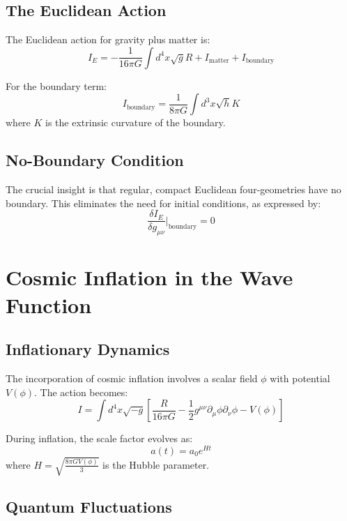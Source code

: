 \documentclass[12pt,a4paper]{article}
\begin{document}
\subsection{The Euclidean Action}

The Euclidean action for gravity plus matter is:
\begin{equation}
I_E = -\frac{1}{16\pi G}\int d^4x \sqrt{g} R + I_{\text{matter}} + I_{\text{boundary}}
\end{equation}

For the boundary term:
\begin{equation}
I_{\text{boundary}} = \frac{1}{8\pi G}\int d^3x \sqrt{h} K
\end{equation}
where $K$ is the extrinsic curvature of the boundary.

\subsection{No-Boundary Condition}

The crucial insight is that regular, compact Euclidean four-geometries have no boundary. This eliminates the need for initial conditions, as expressed by:
\begin{equation}
\frac{\delta I_E}{\delta g_{\mu\nu}}\bigg|_{\text{boundary}} = 0
\end{equation}

\section{Cosmic Inflation in the Wave Function}

\subsection{Inflationary Dynamics}

The incorporation of cosmic inflation involves a scalar field $\phi$ with potential $V(\phi)$. The action becomes:
\begin{equation}
I = \int d^4x \sqrt{-g}\left[\frac{R}{16\pi G} - \frac{1}{2}g^{\mu\nu}\partial_\mu\phi\partial_\nu\phi - V(\phi)\right]
\end{equation}

During inflation, the scale factor evolves as:
\begin{equation}
a(t) = a_0 e^{Ht}
\end{equation}
where $H = \sqrt{\frac{8\pi G V(\phi)}{3}}$ is the Hubble parameter.

\subsection{Quantum Fluctuations}
\end{document}
